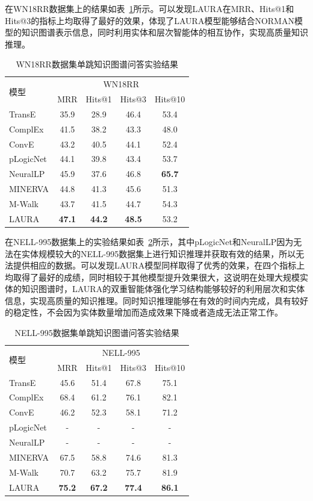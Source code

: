 \documentclass[algorithmlist, AutoFakeBold, AutoFakeSlant, figurelist, tablelist, nomlist, masters]{seuthesix}
\begin{document}
在WN18RR数据集上的结果如表~\ref{Experiment2_WN18RR}所示。可以发现LAURA在MRR、Hits@1和Hits@3的指标上均取得了最好的效果，体现了LAURA模型能够结合NORMAN模型的知识图谱表示信息，同时利用实体和层次智能体的相互协作，实现高质量知识推理。
\begin{table}[]
  \centering
  \begin{tabular*}{0.95\textwidth}{@{\extracolsep{\fill}}lcccc}
  \toprule[1pt]
  \multirow{2}{*}{模型} & \multicolumn{4}{c}{WN18RR}   \\
    & MRR & Hits@1 & Hits@3 & Hits@10 \\ \hline
  TransE & 35.9 & 28.9 & 46.4 & 53.4 \\
  ComplEx & 41.5 & 38.2 & 43.3 & 48.0 \\
  ConvE & 43.2 & 40.5 & 44.1 & 52.4 \\
  pLogicNet & 44.1 & 39.8 & 43.4 & 53.7 \\
  NeuralLP & 45.9 & 37.6 & 46.8 & \textbf{65.7} \\
  MINERVA & 44.8 & 41.3 & 45.6 & 51.3 \\
  M-Walk & 43.7 & 41.5 & 44.7 & 54.3 \\
  LAURA & \textbf{47.1} & \textbf{44.2} & \textbf{48.5} & 53.2 \\
  \bottomrule[1pt]
  \end{tabular*}
  \caption{WN18RR数据集单跳知识图谱问答实验结果}
  \label{Experiment2_WN18RR}
\end{table}

在NELL-995数据集上的实验结果如表~\ref{Experiment2_NELL-995}所示，其中pLogicNet和NeuralLP因为无法在实体规模较大的NELL-995数据集上进行知识推理并获取有效的结果，所以无法提供相应的数据。可以发现LAURA模型同样取得了优秀的效果，在四个指标上均取得了最好的成绩，同时相较于其他模型提升效果很大，这说明在处理大规模实体的知识图谱时，LAURA的双重智能体强化学习结构能够较好的利用层次和实体信息，实现高质量的知识推理。同时知识推理能够在有效的时间内完成，具有较好的稳定性，不会因为实体数量增加而造成效果下降或者造成无法正常工作。
\begin{table}[]
  \centering
  \begin{tabular*}{0.95\textwidth}{@{\extracolsep{\fill}}lcccc}
  \toprule[1pt]
  \multirow{2}{*}{模型} & \multicolumn{4}{c}{NELL-995}   \\
    & MRR & Hits@1 & Hits@3 & Hits@10 \\ \hline
  TransE & 45.6 & 51.4 & 67.8 & 75.1 \\
  ComplEx & 68.4 & 61.2 & 76.1 & 82.1 \\
  ConvE & 46.2 & 52.3 & 58.1 & 71.2 \\
  pLogicNet & - & - & - & - \\
  NeuralLP & - & - & - & - \\
  MINERVA & 67.5 & 58.8 & 74.6 & 81.3 \\
  M-Walk & 70.7 & 63.2 & 75.7 & 81.9 \\
  LAURA & \textbf{75.2} & \textbf{67.2} & \textbf{77.4} & \textbf{86.1} \\
  \bottomrule[1pt]
  \end{tabular*}
  \caption{NELL-995数据集单跳知识图谱问答实验结果}
  \label{Experiment2_NELL-995}
\end{table}
\end{document}

